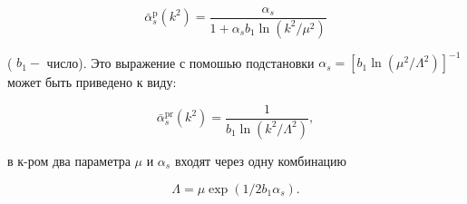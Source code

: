 \documentclass[10pt]{article}
\begin{document}
\[

\bar{\alpha}_{s}^{\mathrm{p}}\left(k^{2}\right)=\frac{\alpha_{s}}{1+\alpha_{s} b_{1} \ln \left(k^{2} / \mu^{2}\right)}

\]



( $b_{1}-$ число). Это выражение с помошью подстановки $\alpha_{s}=\left[b_{1} \ln \left(\mu^{2} / \Lambda^{2}\right)\right]^{-1}$ может быть приведено к виду:



\[

\bar{\alpha}_{s}^{\mathrm{pr}}\left(k^{2}\right)=\frac{1}{b_{1} \ln \left(k^{2} / \Lambda^{2}\right)},

\]



в к-ром два параметра $\mu$ и $\alpha_{s}$ входят через одну комбинацию



\[

\Lambda=\mu \exp \left(1 / 2 b_{1} \alpha_{s}\right) .

\]
\end{document}
